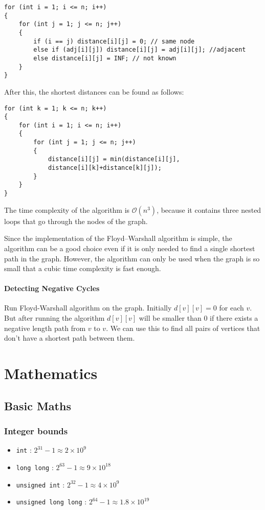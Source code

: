\documentclass[twoside,12pt,a4paper,english]{book}
\theoremstyle{definition}
\theoremstyle{problemstyle}
\theoremstyle{problemstyle}
\theoremstyle{problemstyle}
\begin{document}
\begin{lstlisting}
for (int i = 1; i <= n; i++) 
{
    for (int j = 1; j <= n; j++) 
    {
        if (i == j) distance[i][j] = 0; // same node
        else if (adj[i][j]) distance[i][j] = adj[i][j]; //adjacent
        else distance[i][j] = INF; // not known
    }
}
\end{lstlisting}
After this, the shortest distances can be found as follows:
\begin{lstlisting}
for (int k = 1; k <= n; k++) 
{
    for (int i = 1; i <= n; i++) 
    {
        for (int j = 1; j <= n; j++) 
        {
            distance[i][j] = min(distance[i][j],
            distance[i][k]+distance[k][j]);
        }
    }
}
\end{lstlisting}

The time complexity of the algorithm is $\mathcal{O}(n^3)$,
because it contains three nested loops
that go through the nodes of the graph.

Since the implementation of the Floyd–Warshall
algorithm is simple, the algorithm can be
a good choice even if it is only needed to find a
single shortest path in the graph.
However, the algorithm can only be used when the graph
is so small that a cubic time complexity is fast enough.

\subsection{Detecting Negative Cycles}

Run Floyd-Warshall algorithm on the graph. Initially $d[v][v]=0$ for each $v$. But after running the algorithm $d[v][v]$ will be smaller than $0$ if there exists a negative length path from $v$ to $v$. We can use this to find all pairs of vertices that don't have a shortest path between them.

\part{Mathematics}
\chapter{Basic Maths}

\section{Integer bounds}

\begin{itemize}
    \item\texttt{int} :  $2^{31} - 1 \approx 2\times10^9$
    \item\texttt{long long} :  $2^{63} - 1 \approx 9\times10^{18}$
    \item\texttt{unsigned int} :  $2^{32} - 1 \approx 4\times10^9$
    \item\texttt{unsigned long long} :  $2^{64} - 1 \approx 1.8\times10^{19}$
\end{itemize}
\end{document}

